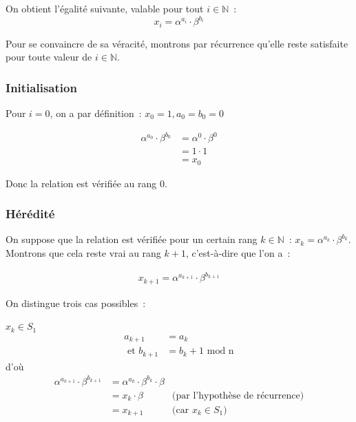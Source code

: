         On obtient l'égalité suivante, valable pour tout $i \in \mathbb{N}$~:
        \begin{equation} \label{eq:1}
          x_i = \alpha^{a_i} \cdot \beta^{b_i}
        \end{equation}

        Pour se convaincre de sa véracité, montrons par récurrence qu'elle reste satisfaite pour toute valeur de $i \in \mathbb{N}$.

        \subsubsection{Initialisation}

        Pour $i = 0$, on a par définition~: $x_0 = 1, a_0 = b_0 = 0$

        \begin{align*}
          \alpha^{a_0} \cdot \beta^{b_0} &= \alpha^{0} \cdot \beta^{0} \\
                                         &= 1 \cdot 1 \\
                                         &= x_0
        \end{align*}

        Donc la relation est vérifiée au rang 0.

        \subsubsection{Hérédité}

        On suppose que la relation est vérifiée pour un certain rang $k \in \mathbb{N}$~: $x_k = \alpha^{a_k} \cdot \beta^{b_k}$. Montrons que cela reste vrai au rang $k + 1$, c'est-à-dire que l'on a~:

        \begin{align*}
          x_{k+1} = \alpha^{a_{k+1}} \cdot \beta^{b_{k+1}}
        \end{align*}

        On distingue trois cas possibles~:

        \underline{$x_{k} \in S_1$}
        \begin{align*}
          a_{k+1} &= a_k \\
          \text{\ et } b_{k+1} &= b_k + 1 \text{\ mod n}
        \end{align*}
        d'où
        \begin{align*}
          \alpha^{a_{k+1}} \cdot \beta^{b_{k+1}} &= \alpha^{a_k} \cdot \beta^{b_k} \cdot \beta \\
                                                 &= x_k \cdot \beta & \text{(par l'hypothèse de récurrence)} \\
                                                 &= x_{k+1} & \text{(car $x_k \in S_1$)}
        \end{align*}


